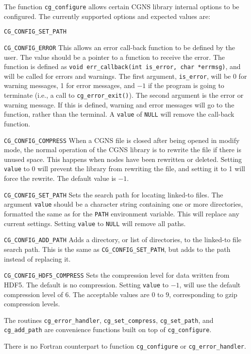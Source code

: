 The function \texttt{cg\_configure} allows certain CGNS library internal
options to be configured.
The currently supported options and expected values are:

\begin{Ventryi}{\texttt{CG\_CONFIG\_SET\_PATH}}
\item [\texttt{CG\_CONFIG\_ERROR}]
      This allows an error call-back function to be defined by the
      user.
      The value should be a pointer to a function to receive the error.
      The function is defined as \texttt{void err\_callback(int is\_error,
      char *errmsg)}, and will be called for errors and warnings.
      The first argument, \texttt{is\_error}, will be 0 for warning
      messages, 1 for error messages, and $-1$ if the program is
      going to terminate (i.e., a call to \texttt{cg\_error\_exit()}).
      The second argument is the error or warning message.
      If this is defined, warning and error messages will go to the
      function, rather than the terminal.
      A \texttt{value} of \texttt{NULL} will remove the call-back
      function.
\item [\texttt{CG\_CONFIG\_COMPRESS}]
      When a CGNS file is closed after being opened in modify mode, the
      normal operation of the CGNS library is to rewrite the file if
      there is unused space.
      This happens when nodes have been rewritten or deleted.
      Setting \texttt{value} to 0 will prevent the library from
      rewriting the file, and setting it to 1 will force the rewrite.
      The default value is $-1$.
\item [\texttt{CG\_CONFIG\_SET\_PATH}]
      Sets the search path for locating linked-to files.
      The argument \texttt{value} should be a character string
      containing one or more directories, formatted the same as for the
      \texttt{PATH} environment variable.
      This will replace any current settings.
      Setting \texttt{value} to \texttt{NULL} will remove all paths.
\item [\texttt{CG\_CONFIG\_ADD\_PATH}]
      Adds a directory, or list of directories, to the linked-to file
      search path.
      This is the same as \texttt{CG\_CONFIG\_SET\_PATH}, but adds to
      the path instead of replacing it.
\item [\texttt{CG\_CONFIG\_HDF5\_COMPRESS}]
      Sets the compression level for data written from HDF5. The default 
      is no compression. Setting \texttt{value} to $-1$, will use the default 
      compression level of $6$. The acceptable values are $0$ to $9$, 
      corresponding to gzip compression levels.
\end{Ventryi}

The routines \texttt{cg\_error\_handler}, \texttt{cg\_set\_compress}, 
\texttt{cg\_set\_path}, and \texttt{cg\_add\_path} are convenience functions 
built on top of \texttt{cg\_configure}.

There is no Fortran counterpart to function \texttt{cg\_configure} or 
\texttt{cg\_error\_handler}. 
